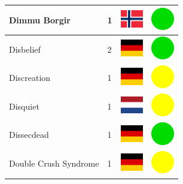 \documentclass[12pt, a4paper, twoside]{report}
\begin{document}
\begin{center}
\begin{longtable}{|p{5cm}|p{2cm}|p{2cm}|p{2cm}|}
			Dimmu Borgir & 1 & \includegraphics[width=1cm]{4x3/no} & \includegraphics[width=1cm]{likes/y} \\ \hline
			Disbelief & 2 & \includegraphics[width=1cm]{4x3/de} & \includegraphics[width=1cm]{likes/y} \\ \hline
			Discreation & 1 & \includegraphics[width=1cm]{4x3/de} & \includegraphics[width=1cm]{likes/m} \\ \hline
			Disquiet & 1 & \includegraphics[width=1cm]{4x3/nl} & \includegraphics[width=1cm]{likes/m} \\ \hline
			Dissecdead & 1 & \includegraphics[width=1cm]{4x3/de} & \includegraphics[width=1cm]{likes/y} \\ \hline
			Double Crush Syndrome & 1 & \includegraphics[width=1cm]{4x3/de} & \includegraphics[width=1cm]{likes/m} \\ \hline

\end{longtable}
\end{center}
\end{document}
